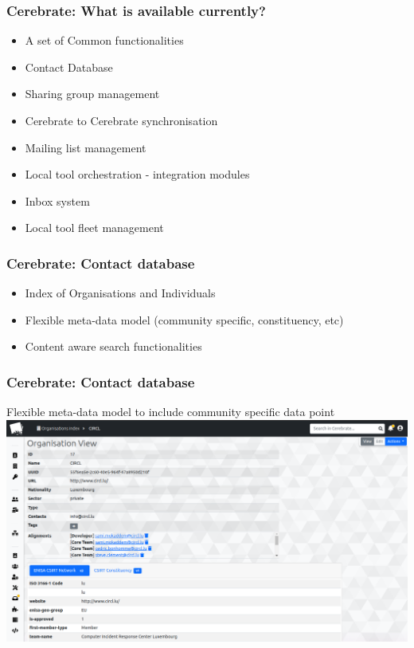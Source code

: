 \begin{frame}
    \frametitle{Cerebrate: What is available currently?}
    \begin{itemize}
        \item A set of Common functionalities
        \item Contact Database
        \item Sharing group management
        \item Cerebrate to Cerebrate synchronisation
        \item Mailing list management
        \item Local tool orchestration - integration modules
        \item Inbox system
        \item Local tool fleet management
    \end{itemize}
\end{frame}

\begin{frame}
    \frametitle{Cerebrate: Contact database}
    \begin{itemize}
        \item Index of Organisations and Individuals
        \item Flexible meta-data model (community specific, constituency, etc)
        \item Content aware search functionalities
    \end{itemize}
\end{frame}

\begin{frame}
    \frametitle{Cerebrate: Contact database}
    Flexible meta-data model to include community specific data point
    \includegraphics[width=0.99\linewidth]{pictures/cerebrate1.png}
\end{frame}

